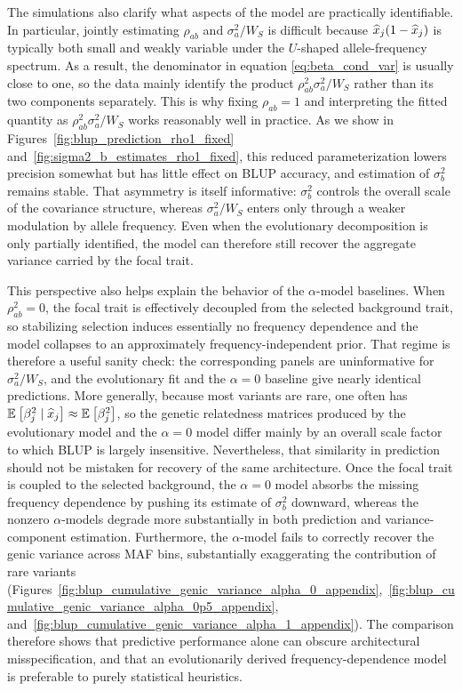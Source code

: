 \documentclass[10pt]{article}
\begin{document}
The simulations also clarify what aspects of the model are practically identifiable. 
In particular, jointly estimating $\rho_{ab}$ and $\sigma_a^2/W_S$ is difficult because $\widehat{x}_j(1-\widehat{x}_j)$ is typically both small and weakly variable under the $U$-shaped allele-frequency spectrum. 
As a result, the denominator in equation \eqref{eq:beta_cond_var} is usually close to one, 
so the data mainly identify the product $\rho_{ab}^2 \sigma_a^2 / W_S$ rather than its two components separately. 
This is why fixing $\rho_{ab}=1$ and interpreting the fitted quantity as $\rho_{ab}^2 \sigma_a^2/W_S$ works reasonably well in practice. 
As we show in Figures~\ref{fig:blup_prediction_rho1_fixed} and~\ref{fig:sigma2_b_estimates_rho1_fixed}, this reduced parameterization lowers precision somewhat but has little effect on BLUP accuracy, and estimation of $\sigma_b^2$ remains stable. 
That asymmetry is itself informative: $\sigma_b^2$ controls the overall scale of the covariance structure, whereas $\sigma_a^2/W_S$ enters only through a weaker modulation by allele frequency. 
Even when the evolutionary decomposition is only partially identified, 
the model can therefore still recover the aggregate variance carried by the focal trait.

This perspective also helps explain the behavior of the $\alpha$-model baselines. 
When $\rho_{ab}^2=0$, the focal trait is effectively decoupled from the selected background trait, 
so stabilizing selection induces essentially no frequency dependence and the model collapses to an approximately frequency-independent prior. 
That regime is therefore a useful sanity check: the corresponding panels are uninformative for $\sigma_a^2/W_S$, 
and the evolutionary fit and the $\alpha=0$ baseline give nearly identical predictions. 
More generally, because most variants are rare, one often has $\mathbb{E}_{}\left[\beta_j^2 \mid \widehat{x}_j\right] \approx \mathbb{E}_{}\left[\beta_j^2\right]$, so the genetic relatedness matrices produced by the evolutionary model and the $\alpha=0$ model differ mainly by an overall scale factor to which BLUP is largely insensitive. 
Nevertheless, that similarity in prediction should not be mistaken for recovery of the same architecture. 
Once the focal trait is coupled to the selected background, the $\alpha=0$ model absorbs the missing frequency dependence by pushing its estimate of $\sigma_b^2$ downward, whereas the nonzero $\alpha$-models degrade more substantially in both prediction and variance-component estimation. 
Furthermore, the $\alpha$-model fails to correctly recover the genic variance across MAF bins,
substantially exaggerating the contribution of rare variants (Figures~\ref{fig:blup_cumulative_genic_variance_alpha_0_appendix},~\ref{fig:blup_cumulative_genic_variance_alpha_0p5_appendix}, and~\ref{fig:blup_cumulative_genic_variance_alpha_1_appendix}).
The comparison therefore shows that predictive performance alone can obscure architectural misspecification, and that an evolutionarily derived frequency-dependence model is preferable to purely statistical heuristics.
\end{document}
